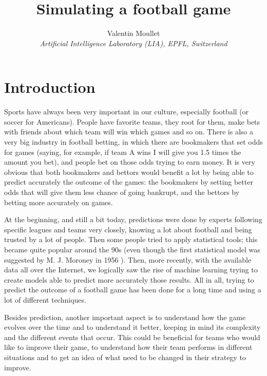 \documentclass[10pt,conference,onecolumn]{IEEEtran}
\begin{document}

\title{Simulating a football game}

\author{
  Valentin Moullet\\
  \textit{Artificial Intelligence Laboratory (LIA), EPFL, Switzerland}
}

\maketitle

\section{Introduction}
Sports have always been very important in our culture, especially football (or soccer for Americans). People have favorite teams, they root for them, make bets with friends about which team will win which games and so on. There is also a very big industry in football betting, in which there are bookmakers that set odds for games (saying, for example, if team A wins I will give you 1.5 times the amount you bet), and people bet on those odds trying to earn money. It is very obvious that both bookmakers and bettors would benefit a lot by being able to predict accurately the outcome of the games: the bookmakers by setting better odds that will give them less chance of going bankrupt, and the bettors by betting more accurately on games.

At the beginning, and still a bit today, predictions were done by experts following specific leagues and teams very closely, knowing a lot about football and being trusted by a lot of people. Then some people tried to apply statistical tools; this became quite popular around the 90s (even though the first statistical model was suggested by M. J. Moroney in 1956 \cite{facts_from_figures}). Then, more recently, with the available data all over the Internet, we logically saw the rise of machine learning trying to create models able to predict more accurately those results. All in all, trying to predict the outcome of a football game has been done for a long time and using a lot of different techniques.

Besides prediction, another important aspect is to understand how the game evolves over the time and to understand it better, keeping in mind its complexity and the different events that occur. This could be beneficial for teams who would like to improve their game, to understand how their team performs in different situations and to get an idea of what need to be changed in their strategy to improve.
\end{document}
